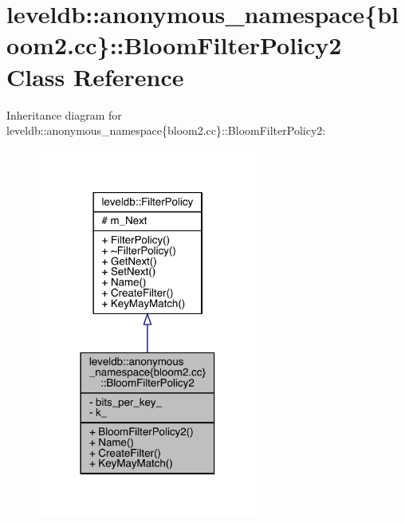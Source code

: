 \hypertarget{classleveldb_1_1anonymous__namespace_02bloom2_8cc_03_1_1_bloom_filter_policy2}{}\section{leveldb\+:\+:anonymous\+\_\+namespace\{bloom2.\+cc\}\+:\+:Bloom\+Filter\+Policy2 Class Reference}
\label{classleveldb_1_1anonymous__namespace_02bloom2_8cc_03_1_1_bloom_filter_policy2}


Inheritance diagram for leveldb\+:\+:anonymous\+\_\+namespace\{bloom2.\+cc\}\+:\+:Bloom\+Filter\+Policy2\+:
\nopagebreak
\begin{figure}[H]
\begin{center}
\leavevmode
\includegraphics[width=206pt]{classleveldb_1_1anonymous__namespace_02bloom2_8cc_03_1_1_bloom_filter_policy2__inherit__graph}
\end{center}
\end{figure}


